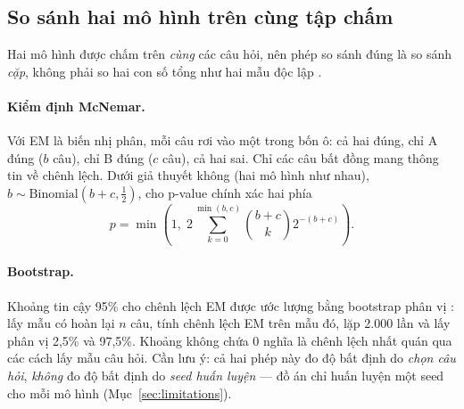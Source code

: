 \subsection{So sánh hai mô hình trên cùng tập chấm}
\label{sec:stat-theory}

Hai mô hình được chấm trên \emph{cùng} các câu hỏi, nên phép so sánh đúng là so sánh
\emph{cặp}, không phải so hai con số tổng như hai mẫu độc lập \cite{dror2018hitchhiker}.

\paragraph{Kiểm định McNemar.} Với EM là biến nhị phân, mỗi câu rơi vào một trong bốn ô: cả hai
đúng, chỉ A đúng ($b$ câu), chỉ B đúng ($c$ câu), cả hai sai. Chỉ các câu bất đồng mang thông tin
về chênh lệch. Dưới giả thuyết không (hai mô hình như nhau), $b \sim \mathrm{Binomial}(b+c, \tfrac12)$,
cho p-value chính xác hai phía \cite{mcnemar1947}
\begin{equation}
  p = \min\!\left(1,\; 2 \sum_{k=0}^{\min(b,c)} \binom{b+c}{k} 2^{-(b+c)} \right).
  \label{eq:mcnemar}
\end{equation}

\paragraph{Bootstrap.} Khoảng tin cậy 95\% cho chênh lệch EM được ước lượng bằng bootstrap
phân vị \cite{efron1993bootstrap}: lấy mẫu có hoàn lại $n$ câu, tính chênh lệch EM trên mẫu đó,
lặp 2.000 lần và lấy phân vị 2,5\% và 97,5\%. Khoảng không chứa 0 nghĩa là chênh lệch nhất quán
qua các cách lấy mẫu câu hỏi. Cần lưu ý: cả hai phép này đo độ bất định do \emph{chọn câu hỏi},
\emph{không} đo độ bất định do \emph{seed huấn luyện} --- đồ án chỉ huấn luyện một seed cho mỗi
mô hình (Mục~\ref{sec:limitations}).
